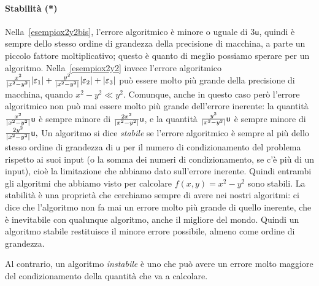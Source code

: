 \documentclass[a4paper]{report}
\DeclarePairedDelimiter{\abs}{\lvert}{\rvert}
\theoremstyle{definition}
\theoremstyle{remark}
\begin{document}
\paragraph{Stabilità (*)}
Nella~\eqref{esempiox2y2bis}, l'errore algoritmico è minore o uguale di $3\mathsf{u}$, quindi è sempre dello stesso ordine di grandezza della precisione di macchina, a parte un piccolo fattore moltiplicativo; questo è quanto di meglio possiamo sperare per un algoritmo. Nella~\eqref{esempiox2y2} invece l'errore algoritmico $\frac{x^2}{\abs{x^2-y^2}}\abs{\varepsilon_1} + \frac{y^2}{\abs{x^2-y^2}} \abs{\varepsilon_2} + \abs{\varepsilon_3}$ può essere molto più grande della precisione di macchina, quando $x^2-y^2 \ll y^2$. Comunque, anche in questo caso però l'errore algoritmico non può mai essere molto più grande dell'errore inerente: la quantità
$
\frac{x^2}{\abs{x^2-y^2}}\mathsf{u}
$
è sempre minore di 
$
\frac{2x^2}{\abs{x^2-y^2}}\mathsf{u}
$, e la quantità 
$
\frac{y^2}{\abs{x^2-y^2}}\mathsf{u}
$
è sempre minore di 
$
\frac{2y^2}{\abs{x^2-y^2}}\mathsf{u},
$
Un algoritmo si dice \emph{stabile} se l'errore algoritmico è sempre al più dello stesso ordine di grandezza di $\mathsf{u}$ per il numero di condizionamento del problema rispetto ai suoi input (o la somma dei numeri di condizionamento, se c'è più di un input), cioè la limitazione che abbiamo dato sull'errore inerente. Quindi entrambi gli algoritmi che abbiamo visto per calcolare $f(x,y) = x^2-y^2$ sono stabili. La stabilità è una proprietà che cerchiamo sempre di avere nei nostri algoritmi: ci dice che l'algoritmo non fa mai un errore molto più grande di quello inerente, che è inevitabile con qualunque algoritmo, anche il migliore del mondo. Quindi un algoritmo stabile restituisce il minore errore possibile, almeno come ordine di grandezza.

Al contrario, un algoritmo \emph{instabile} è uno che può avere un errore molto maggiore del condizionamento della quantità che va a calcolare.
\end{document}
